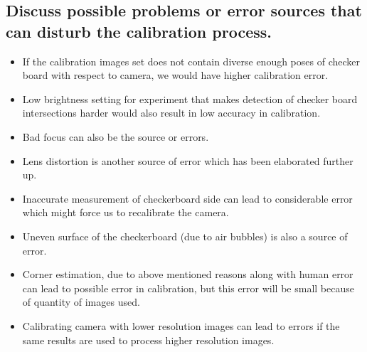 \subsection{Discuss possible problems or error sources that can disturb the calibration process.}
\begin{itemize}
\item If the calibration images set does not contain diverse enough poses of checker board with respect to camera, we would have higher calibration error.
\item Low brightness setting for experiment that makes detection of checker board intersections harder would also result in low accuracy in calibration.
\item Bad focus can also be the source or errors.
\item Lens distortion is another source of error which has been elaborated further up.
\item Inaccurate measurement of checkerboard side can lead to considerable error which might force us to recalibrate the camera. 
\item Uneven surface of the checkerboard (due to air bubbles) is also a source of error. 
\item Corner estimation, due to above mentioned reasons along with human error can lead to possible error in calibration, but this error will be small because of quantity of images used. 
\item Calibrating camera with lower resolution images can lead to errors if the same results are used to process higher resolution images. 
   
\end{itemize}


